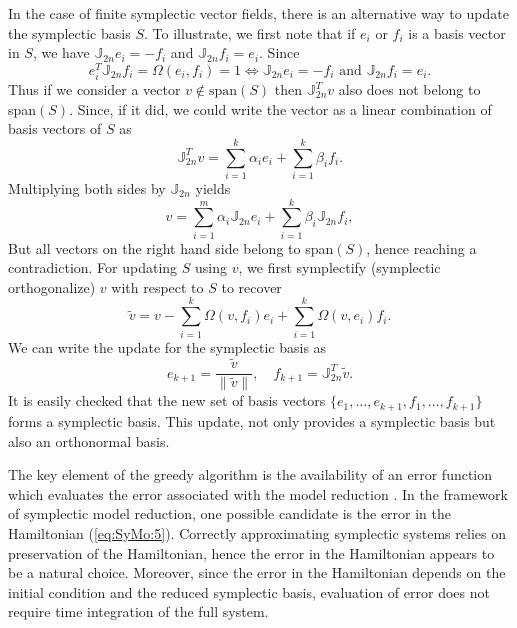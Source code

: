 In the case of finite symplectic vector fields, there is an alternative way to update the symplectic basis $S$. To illustrate, we first note that if $e_i$ or $f_i$ is a basis vector in $S$, we have $\mathbb J_{2n}e_i = -f_i$ and $\mathbb J_{2n}f_i = e_i$. Since
\begin{equation}
	e_i^T\mathbb J_{2n} f_i = \Omega(e_i,f_i) = 1 \Longleftrightarrow \mathbb J_{2n} e_i = - f_i \text{ and } \mathbb J_{2n} f_i = e_i.
\end{equation}
Thus if we consider a vector $v\not \in \text{span}(S)$ then $\mathbb J_{2n}^T v $ also does not belong to span$(S)$. Since, if it did, we could write the vector as a linear combination of basis vectors of $S$ as
\begin{equation}
	\mathbb J_{2n}^T v = \sum_{i=1}^k \alpha_i e_i + \sum_{i=1}^k \beta_i f_i.
\end{equation}
Multiplying both sides by $\mathbb J_{2n}$ yields
\begin{equation}
	v = \sum_{i=1}^m \alpha_i \mathbb J_{2n} e_i + \sum_{i=1}^k \beta_i \mathbb J_{2n} f_i,
\end{equation}
But all vectors on the right hand side belong to span$(S)$, hence reaching a contradiction. For updating $S$ using $v$, we first symplectify (symplectic orthogonalize) $v$ with respect to $S$ to recover
\begin{equation}
	\tilde v = v - \sum_{i=1}^k \Omega(v,f_i)e_i + \sum_{i=1}^k \Omega (v,e_i)f_i.
\end{equation}
We can write the update for the symplectic basis as
\begin{equation}
	e_{k+1} = \frac{\tilde v}{\|\tilde v\|},\quad f_{k+1} = \mathbb J_{2n}^T \tilde v.
\end{equation}
It is easily checked that the new set of basis vectors $\{e_1,\dots,e_{k+1},f_1,\dots,f_{k+1} \}$ forms a symplectic basis. This update, not only provides a symplectic basis but also an orthonormal basis.

The key element of the greedy algorithm is the availability of an error function which evaluates the error associated with the model reduction \cite{Anonymous:2016wl}. In the framework of symplectic model reduction, one possible candidate is the error in the Hamiltonian (\ref{eq:SyMo:5}). Correctly approximating symplectic systems relies on preservation of the Hamiltonian, hence the error in the Hamiltonian appears to be a natural choice. Moreover, since the error in the Hamiltonian depends on the initial condition and the reduced symplectic basis, evaluation of error does not require time integration of the full system. 

